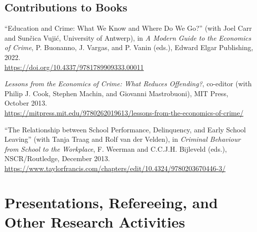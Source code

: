 \documentclass[11pt,a4paper]{article}
\begin{document}
\subsection{Contributions to Books}
\begin{pubs}
  \item ``Education and Crime: What We Know and Where Do We Go?'' (with Joel Carr and Sun\v{c}ica Vuji\'c, University of Antwerp), in \emph{A Modern Guide to the Economics of Crime}, P. Buonanno, J. Vargas, and P. Vanin (eds.), Edward Elgar Publishing, 2022.\\
  \url{https://doi.org/10.4337/9781789909333.00011}
  \item \emph{Lessons from the Economics of Crime: What Reduces Offending?}, co-editor (with Philip J. Cook, Stephen Machin, and Giovanni Mastrobuoni), MIT Press, October 2013.\\
  \url{https://mitpress.mit.edu/9780262019613/lessons-from-the-economics-of-crime/}
  \item ``The Relationship between School Performance, Delinquency, and Early School Leaving'' (with Tanja Traag and Rolf van der Velden), in \emph{Criminal Behaviour from School to the Workplace}, F. Weerman and C.C.J.H. Bijleveld (eds.), NSCR/Routledge, December 2013.\\
  \url{https://www.taylorfrancis.com/chapters/edit/10.4324/9780203670446-3/}
\end{pubs}

\section{Presentations, Refereeing, and Other Research Activities}
\end{document}
